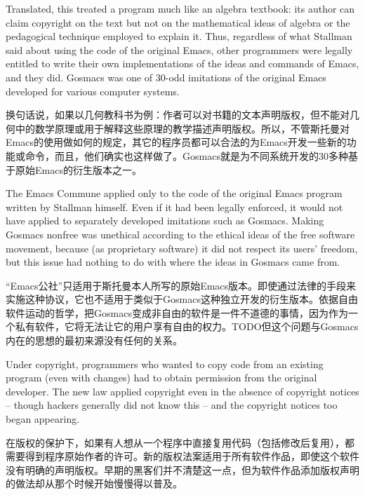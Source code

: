 \ifdefined\eng
Translated, this treated a program much like an algebra textbook: its author can claim copyright on the text but not on the mathematical ideas of algebra or the pedagogical technique employed to explain it.  Thus, regardless of what Stallman said about using the code of the original Emacs, other programmers were legally entitled to write their own implementations of the ideas and commands of Emacs, and they did.  Gosmacs was one of 30-odd imitations of the original Emacs developed for various computer systems.
\fi

\ifdefined\chs
换句话说，如果以几何教科书为例：作者可以对书籍的文本声明版权，但不能对几何中的数学原理或用于解释这些原理的教学描述声明版权。所以，不管斯托曼对Emacs的使用做如何的规定，其它的程序员都可以合法的为Emacs开发一些新的功能或命令，而且，他们确实也这样做了。Gosmacs就是为不同系统开发的30多种基于原始Emacs的衍生版本之一。
\fi

\ifdefined\eng
The Emacs Commune applied only to the code of the original Emacs program written by Stallman himself.  Even if it had been legally enforced, it would not have applied to separately developed imitations such as Gosmacs.  Making Gosmacs nonfree was unethical according to the ethical ideas of the free software movement, because (as proprietary software) it did not respect its users' freedom, but this issue had nothing to do with where the ideas in Gosmacs came from.
\fi

\ifdefined\chs
``Emacs公社''只适用于斯托曼本人所写的原始Emacs版本。即使通过法律的手段来实施这种协议，它也不适用于类似于Gosmacs这种独立开发的衍生版本。依据自由软件运动的哲学，把Gosmacs变成非自由的软件是一件不道德的事情，因为作为一个私有软件，它将无法让它的用户享有自由的权力。TODO但这个问题与Gosmacs内在的思想的最初来源没有任何的关系。
\fi

\ifdefined\eng
Under copyright, programmers who wanted to copy code from an existing program (even with changes) had to obtain permission from the original developer. The new law applied copyright even in the absence of copyright notices -- though hackers generally did not know this -- and the copyright notices too began appearing.
\fi

\ifdefined\chs
在版权的保护下，如果有人想从一个程序中直接复用代码（包括修改后复用），都需要得到程序原始作者的许可。新的版权法案适用于所有软件作品，即使这个软件没有明确的声明版权。早期的黑客们并不清楚这一点，但为软件作品添加版权声明的做法却从那个时候开始慢慢得以普及。
\fi

